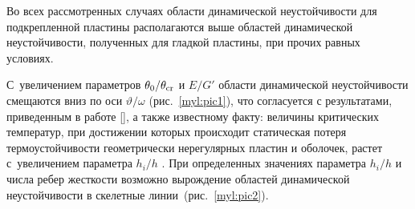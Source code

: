 Во всех рассмотренных случаях области динамической неустойчивости для подкрепленной пластины располагаются выше областей динамической неустойчивости, полученных для гладкой пластины, при прочих равных условиях. 

С~увеличением параметров $\theta_0/\theta_{\rm cr}$  и $E/G'$  области динамической неустойчивости смещаются вниз по оси ${\vartheta}/{\omega}$ (рис.~\ref{myl:pic1}), что согласуется с результатами, приведенным в работе [], а также известному факту: величины критических температур, при достижении которых происходит статическая потеря термоустойчивости  геометрически нерегулярных пластин и оболочек, растет с~увеличением параметра $h_i/h$  \cite{mylpolbel:bib:BelRassudov18}. При определенных значениях параметра $h_i/h$  и числа ребер жесткости возможно вырождение областей динамической неустойчивости в скелетные линии~(рис.~\ref{myl:pic2}).
























